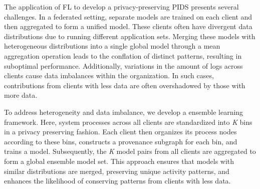 


The application of FL to develop a privacy-preserving PIDS presents several challenges. In a federated setting, separate models are trained on each client and then aggregated to form a unified model. These clients often have divergent data distributions due to running different application sets. Merging these models with heterogeneous distributions into a single global model through a mean aggregation operation leads to the conflation of distinct patterns, resulting in suboptimal performance. Additionally, variations in the amount of \logs logs across clients cause data imbalances within the organization. In such cases, contributions from clients with less data are often overshadowed by those with more data.

To address heterogeneity and data imbalance, we develop a \gnnshort ensemble learning framework. Here, system processes across all clients are standardized into \textit{K} bins in a privacy preserving fashion. Each client then organizes its process nodes according to these bins, constructs a provenance subgraph for each bin, and trains a \gnnshort model. Subsequently, the \textit{K} model pairs from all clients are aggregated to form a global ensemble model set. This approach ensures that models with similar distributions are merged, preserving unique activity patterns, and enhances the likelihood of conserving patterns from clients with less data.

